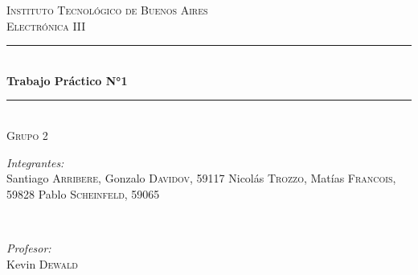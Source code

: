 \begin{titlepage}

    \newcommand{\HRule}{\rule{\linewidth}{0.5mm}} %
    
    \center %
     
    
    \textsc{\LARGE  Instituto Tecnológico de Buenos Aires}\\[1.5cm] %
    \textsc{\large Electrónica III}\\[0.5cm] %
    
    
    \HRule \\[0.4cm]
    { \huge \bfseries Trabajo Práctico N°1}\\[0.4cm] %
    \HRule \\[1.5cm]
     \textsc{\large Grupo 2}\\[0.5cm] 
    
    \begin{minipage}{0.5\textwidth}
    \begin{flushleft} \large
    \emph{Integrantes:}\\
    Santiago \textsc{Arribere, } \newline %
    Gonzalo \textsc{Davidov, 59117}\newline
    Nicolás \textsc{Trozzo, }\newline
    Matías \textsc{Francois, 59828}\newline
    Pablo \textsc{Scheinfeld, 59065}
    
    \end{flushleft}
    \end{minipage}
    ~
    \begin{minipage}{0.4\textwidth}
    \begin{flushright} \large
    \emph{Profesor:} \\
    Kevin \textsc{Dewald} %
    \end{flushright}
    \end{minipage}\\[1cm]
    

\end{titlepage}

